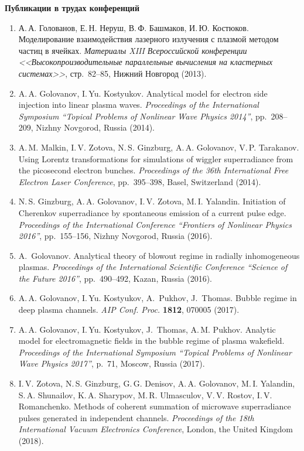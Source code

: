 \documentclass[12pt,a4paper]{scrartcl}
\begin{document}
\noindent\textbf{Публикации в трудах конференций}

\begin{enumerate}[parsep=0em, itemsep=0.3em]
\item{ А.\,А. Голованов, Е.\,Н. Неруш, В.\,Ф. Башмаков, И.\,Ю. Костюков. Моделирование взаимодействия лазерного излучения с плазмой методом частиц в ячейках. \textit{Материалы XIII Всероссийской конференции <<Высокопроизводительные параллельные вычисления на кластерных системах>>}, стр.~82--85, Нижний Новгород (2013).}
\item{A.\,A. Golovanov, I.\,Yu. Kostyukov. Analytical model for electron side injection into linear plasma waves. \textit{Proceedings of the International Symposium ``Topical Problems of Nonlinear Wave Physics 2014''}, pp.~208--209, Nizhny Novgorod, Russia (2014).}
\item{A.\,M. Malkin, I.\,V. Zotova, N.\,S. Ginzburg, A.\,A. Golovanov, V.\,P. Tarakanov. Using Lorentz transformations for simulations of wiggler superradiance from the picosecond electron bunches. \textit{Proceedings of the 36th International Free Electron Laser Conference}, pp.~395--398, Basel, Switzerland (2014).}
\item{N.\,S. Ginzburg, A.\,A. Golovanov, I.\,V. Zotova, M.\,I. Yalandin. Initiation of Cherenkov superradiance by spontaneous emission of a current pulse edge. \textit{Proceedings of the International Conference ``Frontiers of Nonlinear Physics 2016''}, pp.~155--156, Nizhny Novgorod, Russia (2016).}
\item{A.~Golovanov. Analytical theory of blowout regime in radially inhomogeneous plasmas. \textit{Proceedings of the International Scientific Conference ``Science of the Future 2016''}, pp.~490--492, Kazan, Russia (2016).}
\item{A.\,A. Golovanov, I.\,Yu. Kostyukov, A.~Pukhov, J.~Thomas. Bubble regime in deep plasma channels. \textit{AIP Conf. Proc.} \textbf{1812}, 070005 (2017).}
\item{A.\,A. Golovanov, I.\,Yu. Kostyukov, J.~Thomas, A.\,M. Pukhov. Analytic model for electromagnetic fields in the bubble regime of plasma wakefield. \textit{Proceedings of the International Symposium ``Topical Problems of Nonlinear Wave Physics 2017''}, p.~71, Moscow, Russia (2017).}
\item{I.\,V. Zotova, N.\,S. Ginzburg, G.\,G. Denisov, A.\,A. Golovanov, M.\,I. Yalandin, S.\,A. Shunailov, K.\,A. Sharypov, M.\,R. Ulmasculov, V.\,V. Rostov, I.\,V. Romanchenko. Methods of coherent summation of microwave superradiance pulses generated in independent channels. \textit{Proceedings of the 18th International Vacuum Electronics Conference}, London, the United Kingdom (2018).}

\end{enumerate}
\end{document}
